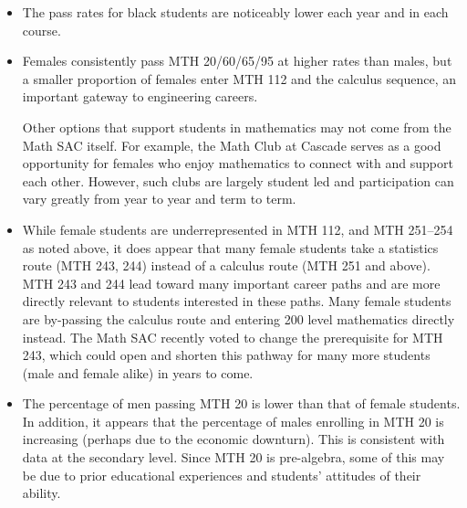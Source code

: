 \begin{itemize}
	some minority students or that minority students place into MTH 20 at a
	disproportionately high rate. Although this is relatively consistent with
	national data, we would like the administration to continue to support
	programs like Passages, Project Independence, ROOTS, and other interventions
	to increase success rates of
	minority students. In addition, a more diverse faculty might help with
	retention and passing rates; \emph{ the extent to which [the instructor's attributes]
		differ from the physical, cultural, and intellectual backgrounds of [his/her] students
		will have a profound effect on the interactions in [the] classroom.}\footnote{\url{http://www.crlt.umich.edu/gsis/p3_2}}
	\item The pass rates for black students are noticeably lower each year and
	in each course.

	\item Females consistently pass MTH 20/60/65/95 at higher rates than males,
	but a smaller proportion of females enter MTH 112 and the calculus
	sequence, an important gateway to engineering careers.


	Other options that support students in
	mathematics may not come from the Math SAC itself. For example, the Math
	Club at Cascade serves as a good opportunity for females who enjoy
	mathematics to connect with and support each other. However, such clubs
	are largely student led and participation can vary greatly from year to
	year and term to term.

	\item While female students are underrepresented in MTH 112, and MTH 251--254
	as noted above, it does appear that many female students take a statistics
	route (MTH 243, 244) instead of a calculus route (MTH 251 and above). MTH 243
	and 244 lead toward many important career paths and are more directly relevant
	to students interested in these paths. Many female students are by-passing
	the calculus route and entering 200 level mathematics directly instead. The
	Math SAC recently voted to change the prerequisite for MTH 243, which could
	open and shorten this pathway for many more students (male and female alike)
	in years to come.

	\item The percentage of men passing MTH 20 is lower than that of female
	students. In addition, it appears that the percentage of males enrolling
	in MTH 20 is increasing (perhaps due to the economic downturn). This is
	consistent with data at the secondary level. Since MTH 20 is pre-algebra,
	some of this may be due to prior educational experiences and students'
	attitudes of their ability.
\end{itemize}

